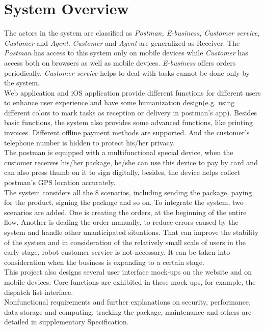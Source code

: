 \documentclass[12pt]{scrreprt}
\begin{document}
\section{System Overview}
The actors in the system are classified as \emph{Postman, E-business, Customer service, Customer} and \emph{Agent}. \emph{Customer} and \emph{Agent} are generalized as Receiver. The \emph{Postman} has access to this system only on mobile devices while \emph{Customer} has access both on browsers as well as mobile devices. \emph{E-business} offers orders periodically. \emph{Customer service} helps to deal with tasks cannot be done only by the system.\\
Web application and iOS application provide different functions for different users to enhance user experience and have some humanization design(e.g. using different colors to mark tasks as reception or delivery in postman’s app). Besides basic functions, the system also provides some advanced functions, like printing invoices. Different offline payment methods are supported. And the customer’s telephone number is hidden to protect his/her privacy.\\
The postman is equipped with a multifunctional special device, when the customer receives his/her package, he/she can use this device to pay by card and can also press thumb on it to sign digitally, besides, the device helps collect postman’s GPS location accurately.\\
The system considers all the 8 scenarios, including sending the package, paying for the product, signing the package and so on. To integrate the system, two scenarios are added. One is creating the orders, at the beginning of the entire flow. Another is dealing the order manually, to reduce errors caused by the system and handle other unanticipated situations. That can improve the stability of the system and in consideration of the relatively small scale of users in the early stage, robot customer service is not necessary. It can be taken into consideration when the business is expanding to a certain stage.\\
This project also designs several user interface mock-ups on the website and on mobile devices. Core functions are exhibited in these mock-ups, for example, the dispatch list interface.\\
Nonfunctional requirements and further explanations on security, performance, data storage and computing, tracking the package, maintenance and others are detailed in supplementary Specification.
\end{document}
